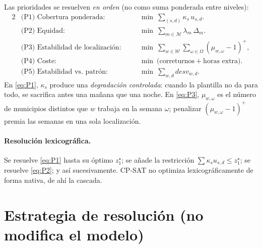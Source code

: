 \documentclass[11pt,a4paper]{article}
\newcommand{\dev}{\mathit{desv}}
\newcommand{\Wk}{\mathcal{W}}
\newcommand{\Mk}{\mathcal{M}}
\newcommand{\posp}[1]{\left(#1\right)^{+}}
\theoremstyle{definition}
\begin{document}
Las prioridades se resuelven \emph{en orden} (no como suma ponderada entre niveles):
\begin{alignat}{2}
  &\text{(P1) Cobertura ponderada:} &\quad& \min\ \sum_{(s,d)}\kappa_{s}\,u_{s,d}. \label{eq:P1}\\
  &\text{(P2) Equidad:} && \min\ \sum_{m\in\Mk}\lambda_{m}\,\Delta_{m}. \label{eq:P2}\\
  &\text{(P3) Estabilidad de localización:} && \min\ \sum_{w\in\Wk}\sum_{\omega\in\Omega}\posp{\mu_{w,\omega}-1}, \label{eq:P3}\\
  &\text{(P4) Coste:} && \min\ \big(\text{correturnos}+\text{horas extra}\big). \label{eq:P4}\\
  &\text{(P5) Estabilidad vs.\ patrón:} && \min\ \sum_{w,d}\dev_{w,d}. \label{eq:P5}
\end{alignat}
En \eqref{eq:P1}, $\kappa_{s}$ produce una \emph{degradación controlada}: cuando la plantilla
no da para todo, se sacrifica antes una mañana que una noche. En \eqref{eq:P3},
$\mu_{w,\omega}$ es el número de municipios distintos que $w$ trabaja en la semana $\omega$;
penalizar $\posp{\mu_{w,\omega}-1}$ premia las semanas en una sola localización.

\paragraph{Resolución lexicográfica.} Se resuelve \eqref{eq:P1} hasta su óptimo $z_{1}^{\star}$;
se añade la restricción $\sum\kappa_{s}u_{s,d}\le z_{1}^{\star}$; se resuelve \eqref{eq:P2};
y así sucesivamente. \textsc{CP-SAT} no optimiza lexicográficamente de forma nativa, de ahí
la cascada.

\section{Estrategia de resolución (no modifica el modelo)}
\end{document}
